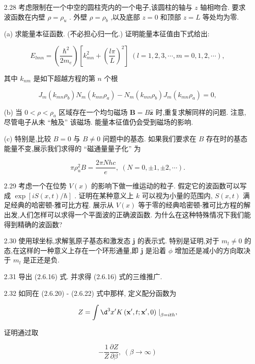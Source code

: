 \documentclass[lang=cn,newtx,10pt,scheme=chinese,thmcnt=section]{elegantbook}
\begin{document}
2.28 考虑限制在一个中空的圆柱壳内的一个电子,该圆柱的轴与 $z$ 轴相吻合. 要求波函数在内壁 $\rho = {\rho }_{u}$ . 外壁 $\rho = {\rho }_{b}$ ,以及底部 $z = 0$ 和顶部 $z = L$ 等处均为零.

(a) 求能量本征函数. (不必担心归一化.) 证明能量本征值由下式给出:

$$
{E}_{lmn} = \left( \frac{{\hbar }^{2}}{2{m}_{e}}\right) \left\lbrack {{k}_{mn}^{2} + {\left( \frac{l\pi }{L}\right) }^{2}}\right\rbrack \;\left( {l = 1,2,3,\cdots, m = 0,1,2,\cdots }\right) ,
$$

其中 ${k}_{nm}$ 是如下超越方程的第 $n$ 个根

$$
{J}_{m}\left( {{k}_{mn}{\rho }_{b}}\right) {N}_{m}\left( {{k}_{mn}{\rho }_{a}}\right) - {N}_{m}\left( {{k}_{mn}{\rho }_{b}}\right) {J}_{m}\left( {{k}_{mn}{\rho }_{a}}\right) = 0,
$$

(b) 当 $0 < \rho < {\rho }_{a}$ 区域存在一个均匀磁场 $\mathbf{B} = B\widehat{\mathbf{z}}$ 时,重复求解同样的问题. 注意,尽管电子从未 “触及” 该磁场. 能量本征值仍会受到磁场的影响.

(c) 特别是,比较 $B = 0$ 与 $B \neq 0$ 问题中的基态. 如果我们要求在 $B$ 存在时的基态能量不变,展示我们求得的 “磁通量量子化” 为

$$
\pi {\rho }_{u}^{2}B = \frac{2\pi Nhc}{e},\;\left( {N = 0, \pm 1, \pm 2,\cdots }\right) .
$$

2.29 考虑一个在位势 $V\left( x\right)$ 的影响下做一维运动的粒子. 假定它的波函数可以写成 $\exp \left\lbrack {{iS}\left( {x, t}\right) /\hbar }\right\rbrack$ . 证明在某种意义上 $k$ 可以视为小量的范围内, $S\left( {x, t}\right)$ 满足经典的哈密顿-雅可比方程. 展示从 $V\left( x\right)$ 等于零的经典哈密顿-雅可比方程的解出发,人们怎样可以求得一个平面波的正确波函数. 为什么在这种特殊情况下我们能得到精确的波函数?

2.30 使用球坐标,求解氢原子基态和激发态 $\mathbf{j}$ 的表示式. 特别是证明,对于 ${m}_{l} \neq 0$ 的态,在这样的一种意义上存在一个环形通量,即 $\mathbf{j}$ 是沿着 $\phi$ 增加还是减小的方向取决于 ${m}_{l}$ 是正还是负.

2.31 导出 (2.6.16) 式. 并求得 (2.6.16) 式的三维推广.

2.32 如同在 (2.6.20) - (2.6.22) 式中那样, 定义配分函数为

$$
Z = \int {\d}^{3}{x}^{\prime }K\left( {{\mathbf{x}}^{\prime }, t;{\mathbf{x}}^{\prime },0}\right) {\left. \right| }_{\beta = {ith}},
$$

证明通过取

$$
- \frac{1}{Z}\frac{\partial Z}{\partial \beta },\;\left( {\beta \rightarrow \infty }\right)
$$
\end{document}
